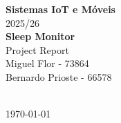 \documentclass[12pt,a4paper]{article}
\begin{document}
\begin{titlepage}
    \centering
    \vspace*{2cm}
    
    {\LARGE \textbf{Sistemas IoT e Móveis}}\\[0.5cm]
    {\Large 2025/26}\\[2cm]
    
    {\Huge \textbf{Sleep Monitor}}\\[1cm]
    {\LARGE Project Report}\\[3cm]
    
    {\Large 
    Miguel Flor - 73864\\[0.3cm]
    Bernardo Prioste - 66578\\[0.3cm]
    }\\[2cm]
    
    \vfill
    
    {\large \today}
    
\end{titlepage}

\tableofcontents
\newpage



% 
% 
% 
% 
% 
\end{document}
